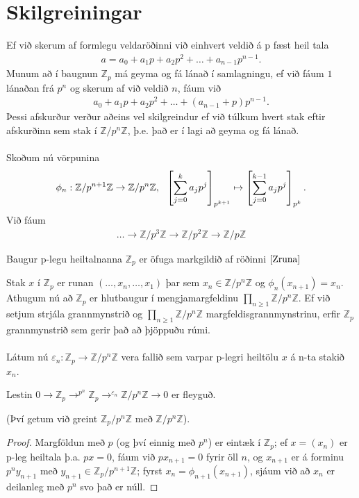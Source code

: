 \section*{Skilgreiningar}
Ef við skerum af formlegu veldaröðinni við einhvert veldið á p fæst heil tala 
\begin{align*}
a = a_0 + a_1 p + a_2 p^2 + \ldots + a_{n-1}p^{n-1}. 
\end{align*}
Munum að í baugnun $\mathbb{Z}_p$ má geyma og fá lánað í samlagningu, ef við 
fáum $1$ lánaðan frá $p^n$ og skerum af við veldið $n$, fáum við 
\begin{align*}
 a_0 + a_1 p + a_2 p^2 + \ldots + (a_{n-1} + p)p^{n-1}.
\end{align*}
Þessi afskurður verður aðeins vel skilgreindur ef við túlkum hvert 
stak eftir afskurðinn sem stak í $\mathbb{Z}/p^n \mathbb{Z}$, þ.e. það 
er í lagi að geyma og fá lánað.\\
\\Skoðum nú vörpunina
\begin{align*}
 \centering \phi_n : \mathbb{Z}/p^{n+1} \mathbb{Z} \rightarrow 
 \mathbb{Z}/p^{n} \mathbb{Z}, \ \  \left[\sum_{j=0}^k a_j p^j \right]
_{p^{k+1}} \mapsto \left[\sum_{j=0}^{k-1} a_j p^j \right]_{p^k}.
\end{align*}
Við fáum
\begin{align}\label{Zruna}
 \ldots \rightarrow \mathbb{Z}/p^{3} \mathbb{Z} \rightarrow \mathbb{Z}/p^{2} 
\mathbb{Z} \rightarrow \mathbb{Z}/p \mathbb{Z}
\end{align}
\begin{skilgr}
 Baugur p-legu heiltalnanna $\mathbb{Z}_p$ er öfuga markgildið af 
röðinni $\ref{Zruna}$
\end{skilgr}
Stak $x$ í $\mathbb{Z}_p$ er runan $(\ldots , x_n, \ldots, x_1)$ þar sem 
$x_n \in \mathbb{Z}/p^n\mathbb{Z}$ og $\phi_n(x_{n+1}) = x_{n}$.
Athugum nú að $\mathbb{Z}_p$ er hlutbaugur í mengjamargfeldinu
 $\prod_{n \geq 1} \mathbb{Z}/p^n\mathbb{Z}$. Ef við setjum strjála 
grannmynstrið og $\prod_{n \geq 1} \mathbb{Z}/p^n\mathbb{Z}$ 
margfeldisgrannmynstrinu, erfir $\mathbb{Z}_p$ grannmynstrið sem 
gerir það að þjöppuðu rúmi.\\
\\Látum nú $\varepsilon_n : \mathbb{Z}_p \rightarrow \mathbb{Z}/p^n 
\mathbb{Z}$ vera fallið sem varpar p-legri heiltölu $x$ á n-ta stakið $x_n$.
\begin{setn}
 Lestin $0 \rightarrow \mathbb{Z}_p \rightarrow^{p^n} \mathbb{Z}_p 
\rightarrow^{\varepsilon_n} \mathbb{Z}/p^n\mathbb{Z} \rightarrow 0$ 
er fleyguð.
\end{setn}
(Því getum við greint $\mathbb{Z}_p/p^n\mathbb{Z}$ með 
$\mathbb{Z}/p^n\mathbb{Z}$).\\
\begin{proof}
Margföldun með $p$ (og því einnig með $p^n$) er eintæk í 
$\mathbb{Z}_p$; ef $x = (x_n)$ er p-leg heiltala þ.a. $px = 0$,
fáum við $px_{n+1} = 0$ fyrir öll $n$, og $x_{n+1}$ er á forminu 
$p^ny_{n+1}$ með $y_{n+1} \in \mathbb{Z}_p/p^{n+1}\mathbb{Z}$; 
fyrst $x_n = \phi_{n+1}(x_{n+1})$, sjáum við að $x_n$ er deilanleg með 
$p^n$ svo það er núll.
\end{proof}



